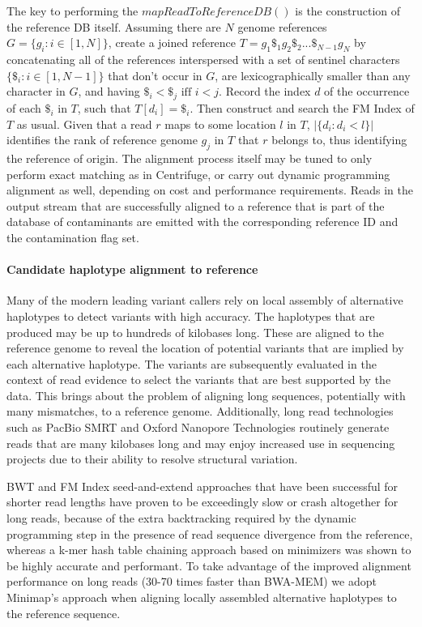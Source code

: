 The key to performing the $mapReadToReferenceDB()$ is the construction of the reference DB itself. Assuming there are $N$ genome references $G = \{g_i: i\in[1,N]\}$, create a joined reference $T = g_1\$_1g_2\$_2...\$_{N-1}g_N$ by concatenating all of the references interspersed with a set of sentinel characters $\{\$_i : i \in [1,N-1]\}$ that don't occur in $G$, are lexicographically smaller than any character in $G$, and having $\$_i < \$_j \text{ iff } i < j$. Record the index $d$ of the occurrence of each $\$_i$ in $T$, such that $T[d_i] = \$_i$. Then construct and search the FM Index of $T$ as usual. Given that a read $r$ maps to some location $l$ in $T$, $|\{d_i : d_i < l\}|$ identifies the rank of reference genome $g_j$ in $T$ that $r$ belongs to, thus identifying the reference of origin. The alignment process itself may be tuned to only perform exact matching as in Centrifuge, or carry out dynamic programming alignment as well, depending on cost and performance requirements. Reads in the output stream that are successfully aligned to a reference that is part of the database of contaminants are emitted with the corresponding reference ID and the contamination flag set.

\paragraph{Candidate haplotype alignment to reference}
Many of the modern leading variant callers\autocites{depristo2011framework}{garrison2012haplotype}{rimmer2014integrating} rely on local assembly of alternative haplotypes to detect variants with high accuracy. The haplotypes that are produced may be up to hundreds of kilobases long. These are aligned to the reference genome to reveal the location of potential variants that are implied by each alternative haplotype. The variants are subsequently evaluated in the context of read evidence to select the variants that are best supported by the data. This brings about the problem of aligning long sequences, potentially with many mismatches, to a reference genome. Additionally, long read technologies such as PacBio SMRT\autocite{rhoads2015pacbio} and Oxford Nanopore Technologies\autocite{lu2016oxford} routinely generate reads that are many kilobases long and may enjoy increased use in sequencing projects due to their ability to resolve structural variation.

BWT and FM Index seed-and-extend approaches\autocites{li2013aligning}{langmead2012fast} that have been successful for shorter read lengths have proven to be exceedingly slow or crash altogether for long reads, because of the extra backtracking required by the dynamic programming step in the presence of read sequence divergence from the reference, whereas a k-mer hash table chaining approach based on minimizers\autocite{roberts2004reducing} was shown to be highly accurate and performant\autocite{li2018minimap2}. To take advantage of the improved alignment performance on long reads (30-70 times faster than BWA-MEM) we adopt Minimap's approach when aligning locally assembled alternative haplotypes to the reference sequence.

